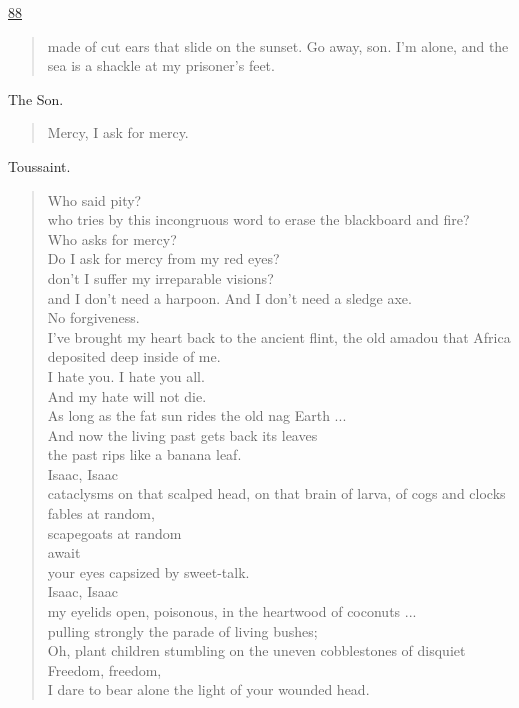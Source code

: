 \documentclass[letterpaper,article,12pt,oneside,notitlepage]{memoir}
\begin{document}
\clearpage

\href{http://cesaire.elotroalex.com/chiens/chiens/p088.html}{88}

\begin{verse}
made of cut ears that slide on the sunset. Go away, son. I'm alone, and the sea is a shackle at my prisoner's feet.  \\
\end{verse}

\begin{center}The Son.\end{center}

\begin{verse}
Mercy, I ask for mercy. \\
\end{verse}

\begin{center}Toussaint.\end{center}

\begin{verse}
Who said pity? \\
who tries by this incongruous word to erase the blackboard and fire? \\
Who asks for mercy? \\
Do I ask for mercy from my red eyes? \\
don't I suffer my irreparable visions? \\
and I don't need a harpoon. And I don't need a sledge axe. \\
No forgiveness. \\
I've brought my heart back to the ancient flint, the old amadou that Africa deposited deep inside of me.  \\
I hate you. I hate you all. \\
And my hate will not die. \\
As long as the fat sun rides the old nag Earth ... \\
And now the living past gets back its leaves \\
the past rips like a banana leaf. \\
Isaac, Isaac \\
cataclysms on that scalped head, on that brain of larva, of cogs and clocks  \\
fables at random, \\
scapegoats at random \\
await \\
your eyes capsized by sweet-talk. \\
Isaac, Isaac \\
my eyelids open, poisonous, in the heartwood of coconuts ... \\
pulling strongly the parade of living bushes; \\
Oh, plant children stumbling on the uneven cobblestones of disquiet \\
Freedom, freedom, \\
I dare to bear alone the light of your wounded head. \\
\end{verse}
\end{document}
